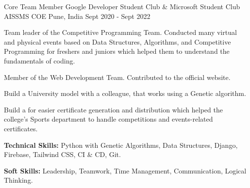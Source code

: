 

\begin{cventries}

  \cventry
    {Core Team Member Google Developer Student Club \& Microsoft Student Club} %
    {AISSMS COE} %
    {Pune, India} %
    {Sept 2020 - Sept 2022} %
    {
      \begin{cvitems} %
        \item {Team leader of the Competitive Programming Team. Conducted many virtual and physical events based on Data Structures, Algorithms, and Competitive Programming for freshers and juniors which helped them to understand the fundamentals of coding.}
        \item {Member of the Web Development Team. Contributed to the  official website.}
        \item {Build a University  model with a colleague, that works using a Genetic algorithm.}
        \item {Build a  for easier certificate generation and distribution which helped the college's Sports department to handle competitions and events-related certificates.}
        \item {\textbf{Technical Skills:} Python with Genetic Algorithms, Data Structures, Django, Firebase, Tailwind CSS, CI \& CD, Git.}
        \item {\textbf{Soft Skills:} Leadership, Teamwork, Time Management, Communication, Logical Thinking.}
      \end{cvitems}
    }


\end{cventries}
